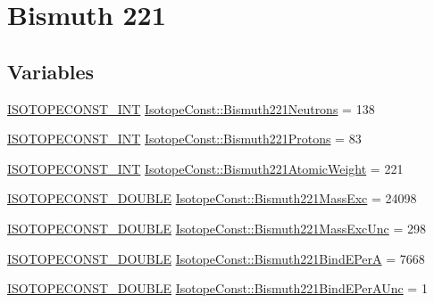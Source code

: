 \hypertarget{group___isotope_const-_bismuth-_bi221}{}\section{Bismuth 221}
\label{group___isotope_const-_bismuth-_bi221}
\subsection*{Variables}
\begin{DoxyCompactItemize}
\item 
\mbox{\hyperlink{group___isotope_const-_macros_ga5f18360b3e99483a35c32d789e62621c}{I\+S\+O\+T\+O\+P\+E\+C\+O\+N\+S\+T\+\_\+\+I\+NT}} \mbox{\hyperlink{group___isotope_const-_bismuth-_bi221_ga766c9655ce5be275103fcbb0243ab4f4}{Isotope\+Const\+::\+Bismuth221\+Neutrons}} = 138
\item 
\mbox{\hyperlink{group___isotope_const-_macros_ga5f18360b3e99483a35c32d789e62621c}{I\+S\+O\+T\+O\+P\+E\+C\+O\+N\+S\+T\+\_\+\+I\+NT}} \mbox{\hyperlink{group___isotope_const-_bismuth-_bi221_ga93a34e60a929fdcfaa62815798a17a2d}{Isotope\+Const\+::\+Bismuth221\+Protons}} = 83
\item 
\mbox{\hyperlink{group___isotope_const-_macros_ga5f18360b3e99483a35c32d789e62621c}{I\+S\+O\+T\+O\+P\+E\+C\+O\+N\+S\+T\+\_\+\+I\+NT}} \mbox{\hyperlink{group___isotope_const-_bismuth-_bi221_gafa34a4da4af1f589238cf713fa30fe61}{Isotope\+Const\+::\+Bismuth221\+Atomic\+Weight}} = 221
\item 
\mbox{\hyperlink{group___isotope_const-_macros_ga8f45a7272ce02c0b4c65c44636ed719a}{I\+S\+O\+T\+O\+P\+E\+C\+O\+N\+S\+T\+\_\+\+D\+O\+U\+B\+LE}} \mbox{\hyperlink{group___isotope_const-_bismuth-_bi221_gabf71f4cecc6c691853cd542c7e89d1b0}{Isotope\+Const\+::\+Bismuth221\+Mass\+Exc}} = 24098
\item 
\mbox{\hyperlink{group___isotope_const-_macros_ga8f45a7272ce02c0b4c65c44636ed719a}{I\+S\+O\+T\+O\+P\+E\+C\+O\+N\+S\+T\+\_\+\+D\+O\+U\+B\+LE}} \mbox{\hyperlink{group___isotope_const-_bismuth-_bi221_ga3de2687f79fcffede355dc44d2e7054c}{Isotope\+Const\+::\+Bismuth221\+Mass\+Exc\+Unc}} = 298
\item 
\mbox{\hyperlink{group___isotope_const-_macros_ga8f45a7272ce02c0b4c65c44636ed719a}{I\+S\+O\+T\+O\+P\+E\+C\+O\+N\+S\+T\+\_\+\+D\+O\+U\+B\+LE}} \mbox{\hyperlink{group___isotope_const-_bismuth-_bi221_ga2b63c3618c1d0d15e2c737ab83e86ae0}{Isotope\+Const\+::\+Bismuth221\+Bind\+E\+PerA}} = 7668
\item 
\mbox{\hyperlink{group___isotope_const-_macros_ga8f45a7272ce02c0b4c65c44636ed719a}{I\+S\+O\+T\+O\+P\+E\+C\+O\+N\+S\+T\+\_\+\+D\+O\+U\+B\+LE}} \mbox{\hyperlink{group___isotope_const-_bismuth-_bi221_gaca2caa5eaa467ab4b63b5ee566c60639}{Isotope\+Const\+::\+Bismuth221\+Bind\+E\+Per\+A\+Unc}} = 1

\end{DoxyCompactItemize}
